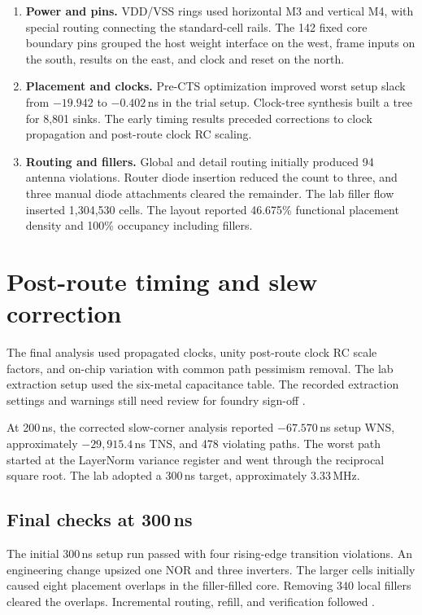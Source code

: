 \begin{enumerate}
\item \textbf{Power and pins.} VDD/VSS rings used horizontal M3 and vertical M4, with special routing connecting the standard-cell rails. The 142 fixed core boundary pins grouped the host weight interface on the west, frame inputs on the south, results on the east, and clock and reset on the north.
\item \textbf{Placement and clocks.} Pre-CTS optimization improved worst setup slack from \(-19.942\) to \(-0.402\)\,ns in the trial setup. Clock-tree synthesis built a tree for 8,801 sinks. The early timing results preceded corrections to clock propagation and post-route clock RC scaling.
\item \textbf{Routing and fillers.} Global and detail routing initially produced 94 antenna violations. Router diode insertion reduced the count to three, and three manual diode attachments cleared the remainder. The lab filler flow inserted 1,304,530 cells. The layout reported 46.675\% functional placement density and 100\% occupancy including fillers.
\end{enumerate}

\section{Post-route timing and slew correction}
The final analysis used propagated clocks, unity post-route clock RC scale factors, and on-chip variation with common path pessimism removal. The lab extraction setup used the six-metal capacitance table. The recorded extraction settings and warnings still need review for foundry sign-off \cite{backend}.

At 200\,ns, the corrected slow-corner analysis reported \(-67.570\)\,ns setup WNS, approximately \(-29{,}915.4\)\,ns TNS, and 478 violating paths. The worst path started at the LayerNorm variance register and went through the reciprocal square root. The lab adopted a 300\,ns target, approximately 3.33\,MHz.

\clearpage
\subsection{Final checks at 300\,ns}
The initial 300\,ns setup run passed with four rising-edge transition violations. An engineering change upsized one NOR and three inverters. The larger cells initially caused eight placement overlaps in the filler-filled core. Removing 340 local fillers cleared the overlaps. Incremental routing, refill, and verification followed \cite{backend}.

